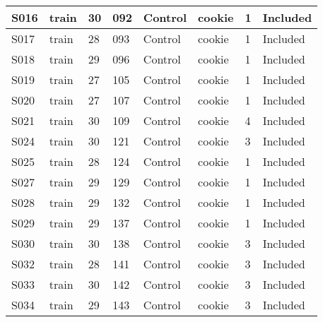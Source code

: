 \begin{center}
\begin{longtable}{|l|l|l|l|l|l|l|l|}
S016           & train                 & 30              & 092     & Control        & cookie          & 1            & Included      \\ \hline
S017           & train                 & 28              & 093     & Control        & cookie          & 1            & Included      \\ \hline
S018           & train                 & 29              & 096     & Control        & cookie          & 1            & Included      \\ \hline
S019           & train                 & 27              & 105     & Control        & cookie          & 1            & Included      \\ \hline
S020           & train                 & 27              & 107     & Control        & cookie          & 1            & Included      \\ \hline
S021           & train                 & 30              & 109     & Control        & cookie          & 4            & Included      \\ \hline
S024           & train                 & 30              & 121     & Control        & cookie          & 3            & Included      \\ \hline
S025           & train                 & 28              & 124     & Control        & cookie          & 1            & Included      \\ \hline
S027           & train                 & 29              & 129     & Control        & cookie          & 1            & Included      \\ \hline
S028           & train                 & 29              & 132     & Control        & cookie          & 1            & Included      \\ \hline
S029           & train                 & 29              & 137     & Control        & cookie          & 1            & Included      \\ \hline
S030           & train                 & 30              & 138     & Control        & cookie          & 3            & Included      \\ \hline
S032           & train                 & 28              & 141     & Control        & cookie          & 3            & Included      \\ \hline
S033           & train                 & 30              & 142     & Control        & cookie          & 3            & Included      \\ \hline
S034           & train                 & 29              & 143     & Control        & cookie          & 3            & Included      \\ \hline

\end{longtable}
\end{center}

